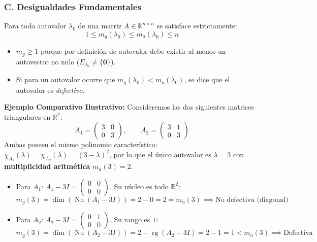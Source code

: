 \documentclass[11pt,a4paper]{article}
\begin{document}
\subsubsection*{C. Desigualdades Fundamentales}
Para todo autovalor $\lambda_0$ de una matriz $A \in \mathbb{K}^{n \times n}$ se satisface estrictamente:
\[
1 \le m_g(\lambda_0) \le m_a(\lambda_0) \le n
\]
\begin{itemize}
    \item $m_g \ge 1$ porque por definición de autovalor debe existir al menos un autovector no nulo ($E_{\lambda_0} \neq \{\mathbf{0}\}$).
    \item Si para un autovalor ocurre que $m_g(\lambda_0) < m_a(\lambda_0)$, se dice que el autovalor es \emph{defectivo}.
\end{itemize}

\vspace{0.4em}
\noindent
\textbf{Ejemplo Comparativo Ilustrativo:}
Consideremos las dos siguientes matrices triangulares en $\mathbb{R}^2$:
\[
A_1 = \begin{pmatrix} 3 & 0 \\ 0 & 3 \end{pmatrix}, \qquad A_2 = \begin{pmatrix} 3 & 1 \\ 0 & 3 \end{pmatrix}
\]
Ambas poseen el mismo polinomio característico: $\chi_{A_1}(\lambda) = \chi_{A_2}(\lambda) = (3 - \lambda)^2$, por lo que el único autovalor es $\lambda = 3$ con \textbf{multiplicidad aritmética} $m_a(3) = 2$.
\begin{itemize}
    \item Para $A_1$: $A_1 - 3I = \begin{pmatrix} 0 & 0 \\ 0 & 0 \end{pmatrix}$. Su núcleo es todo $\mathbb{R}^2$:
    \[
    m_g(3) = \dim(\operatorname{Nu}(A_1 - 3I)) = 2 - 0 = 2 = m_a(3) \implies \text{No defectiva (diagonal)}
    \]
    \item Para $A_2$: $A_2 - 3I = \begin{pmatrix} 0 & 1 \\ 0 & 0 \end{pmatrix}$. Su rango es $1$:
    \[
    m_g(3) = \dim(\operatorname{Nu}(A_2 - 3I)) = 2 - \operatorname{rg}(A_2 - 3I) = 2 - 1 = 1 < m_a(3) \implies \text{Defectiva}
    \]
\end{itemize}

\end{document}
